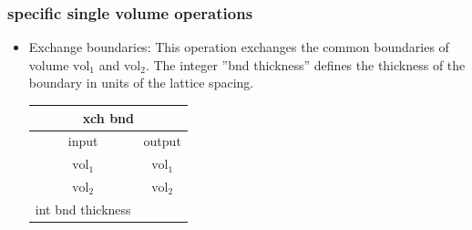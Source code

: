 \documentclass[12pt,a4paper]{article}
\newcommand{\bet}[1]{\begin{center}
		     \begin{tabular}{|c|c|}
		     \hline
		     \multicolumn{2}{|c|}{#1}\\
		     \hline\hline
		     input & output \\
                     \hline}
\newcommand{\eet}{\hline
		  \end{tabular}
		  \end{center}}
\begin{document}
\subsubsection{specific single volume operations}

\begin{itemize}

\item Exchange boundaries:
\newline
This operation exchanges the common boundaries of volume $\mathrm{vol}_1$ and
$\mathrm{vol}_2$. The integer ''bnd thickness'' defines the thickness of the 
boundary in units of the lattice spacing. 
\bet{xch bnd}
$\mathrm{vol}_1$ & $\mathrm{vol}_1$\\
$\mathrm{vol}_2$ & $\mathrm{vol}_2$\\
int bnd thickness & \\ 
\eet

\end{itemize}
\end{document}
